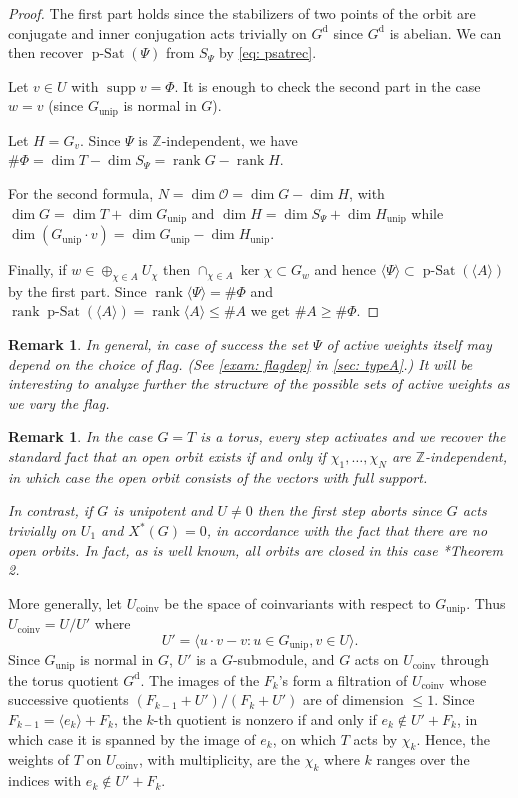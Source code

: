 \documentclass[12pt]{article}
\newtheorem{remark}[theorem]{Remark}
\newcommand{\Z}{\mathbb{Z}}
\newcommand{\rk}{\operatorname{rank}}
\newcommand{\supp}{\operatorname{supp}}
\newcommand{\rad}[1]{#1_{\operatorname{unip}}}
\newcommand{\orbit}{\mathcal{O}}
\newcommand{\pSat}{\operatorname{p-Sat}}
\newcommand{\diag}{\mathrm{d}}
\newcommand{\coinv}{\operatorname{coinv}}
\begin{document}
\begin{proof}
The first part holds since the stabilizers of two points of the orbit are conjugate and
inner conjugation acts trivially on $G^{\diag}$ since $G^{\diag}$ is abelian.
We can then recover $\pSat(\Psi)$ from $S_\Psi$ by \cref{eq: psatrec}.

Let $v\in U$ with $\supp v=\Phi$.
It is enough to check the second part in the case $w=v$ (since $\rad{G}$ is normal in $G$).

Let $H=G_v$.
Since $\Psi$ is $\Z$-independent, we have $\#\Phi=\dim T-\dim S_\Psi=\rk G-\rk H$.

For the second formula,
$N=\dim\orbit=\dim G-\dim H$, with $\dim G=\dim T+\dim \rad{G}$ and
$\dim H=\dim S_\Psi+\dim \rad{H}$ while $\dim(\rad{G}\cdot v)=\dim \rad{G}-\dim \rad{H}$.

Finally, if $w\in\oplus_{\chi\in A} U_\chi$ then $\cap_{\chi\in A}\ker\chi\subset G_w$ and hence $\langle\Psi\rangle\subset\pSat(\langle A\rangle)$ by the first part.
Since $\rk\langle\Psi\rangle=\#\Phi$ and $\rk\pSat(\langle A\rangle)=\rk\langle A\rangle\le\# A$ we get $\# A\ge\#\Phi$.
\end{proof}

\begin{remark} \label{rem: dependsonflag}
In general, in case of success the set $\Psi$ of active weights itself may depend on the choice of flag.
(See \cref{exam: flagdep} in \cref{sec: typeA}.)
It will be interesting to analyze further the structure of the possible sets of active weights as we vary the flag.
\end{remark}

\begin{remark} \label{rem: coinvactiv}
In the case $G=T$ is a torus, every step activates and we recover the standard fact that an open orbit
exists if and only if $\chi_1,\dots,\chi_N$ are $\Z$-independent, in which case the open orbit consists
of the vectors with full support.

In contrast, if $G$ is unipotent and $U\ne0$ then the first step aborts since $G$ acts trivially on $U_1$ and $X^*(G)=0$,
in accordance with the fact that there are no open orbits. In fact, as is well known, all orbits are closed in this case \cite{MR130878}*{Theorem 2}.
\end{remark}

More generally, let $U_{\coinv}$ be the space of coinvariants with respect to $\rad{G}$.
Thus $U_{\coinv}=U/U'$ where
\begin{equation} \label{eq: radcoinv} 
U'=\langle u\cdot v-v:u\in \rad{G}, v\in U\rangle.
\end{equation}
Since $\rad{G}$ is normal in $G$, $U'$ is a $G$-submodule, and $G$ acts on $U_{\coinv}$ through the torus quotient $G^{\diag}$.
The images of the $F_k$'s form a filtration of $U_{\coinv}$ whose successive quotients $(F_{k-1}+U')/(F_k+U')$ are of dimension $\le1$.
Since $F_{k-1}=\langle e_k\rangle+F_k$, the $k$-th quotient is nonzero if and only if $e_k\notin U'+F_k$, in which case it is spanned
by the image of $e_k$, on which $T$ acts by $\chi_k$.
Hence, the weights of $T$ on $U_{\coinv}$, with multiplicity, are the $\chi_k$ where $k$ ranges over the indices with $e_k\notin U'+F_k$.
\end{document}
